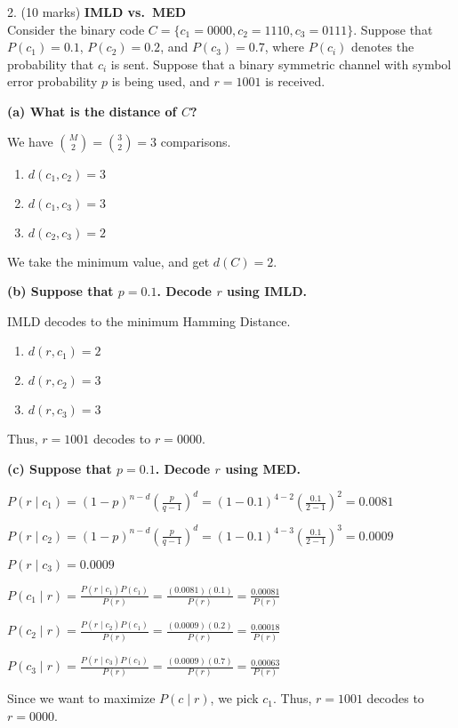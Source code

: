 


2. (10 marks)
\textbf{IMLD vs.\ MED}\\
Consider the binary code $C=\{c_1=0000,c_2=1110,c_3=0111\}$.
Suppose that $P(c_1)=0.1$, $P(c_2)=0.2$, and $P(c_3)=0.7$, where $P(c_i)$
denotes the probability that $c_i$ is sent. Suppose that a binary
symmetric channel with symbol error probability $p$ is being used,
and $r=1001$ is received.

\textbf{(a) What is the distance of $C$?}

We have $ \binom{M}{2}=\binom{3}{2}=3 $ comparisons.
\begin{enumerate}
    \item $ d(c_1,c_2)=3 $
    \item $ d(c_1,c_3)=3 $
    \item $ d(c_2,c_3)=2 $
\end{enumerate}
We take the minimum value, and get $ d(C)=2 $.

\textbf{(b) Suppose that $p=0.1$. Decode $r$ using IMLD.}

IMLD decodes to the minimum Hamming Distance.
\begin{enumerate}
    \item $ d(r,c_1)=2 $
    \item $ d(r,c_2)=3 $
    \item $ d(r,c_3)=3 $
\end{enumerate}
Thus, $ r=1001 $ decodes to $ r=0000 $.

\textbf{(c) Suppose that $p=0.1$. Decode $r$ using MED.}

$ P(r\mid c_1)
=(1-p)^{n-d}\left( \frac{p}{q-1} \right)^d
=(1-0.1)^{4-2}\left( \frac{0.1}{2-1} \right)^{2}
=0.0081 $

$ P(r\mid c_2)
=(1-p)^{n-d}\left( \frac{p}{q-1} \right)^d
=(1-0.1)^{4-3}\left( \frac{0.1}{2-1} \right)^{3}
=0.0009 $

$ P(r\mid c_3)=0.0009 $

$ P(c_1\mid r)
=\frac{P(r\mid c_1)P(c_1)}{P(r)}
=\frac{(0.0081)(0.1)}{P(r)}
=\frac{0.00081}{P(r)} $

$ P(c_2\mid r)
=\frac{P(r\mid c_2)P(c_1)}{P(r)}
=\frac{(0.0009)(0.2)}{P(r)}
=\frac{0.00018}{P(r)} $

$ P(c_3\mid r)
=\frac{P(r\mid c_3)P(c_1)}{P(r)}
=\frac{(0.0009)(0.7)}{P(r)}
=\frac{0.00063}{P(r)} $

Since we want to maximize $ P(c\mid r) $, we pick $ c_1 $. Thus,
$ r=1001 $ decodes to $ r=0000 $.

